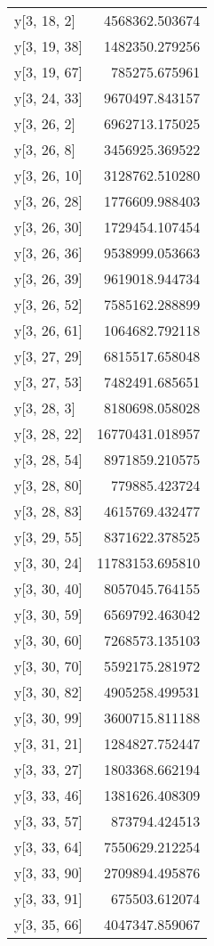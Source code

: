 \begin{longtable}{lr}
y[3, 18, 2] & 4568362.503674 \\
y[3, 19, 38] & 1482350.279256 \\
y[3, 19, 67] & 785275.675961 \\
y[3, 24, 33] & 9670497.843157 \\
y[3, 26, 2] & 6962713.175025 \\
y[3, 26, 8] & 3456925.369522 \\
y[3, 26, 10] & 3128762.510280 \\
y[3, 26, 28] & 1776609.988403 \\
y[3, 26, 30] & 1729454.107454 \\
y[3, 26, 36] & 9538999.053663 \\
y[3, 26, 39] & 9619018.944734 \\
y[3, 26, 52] & 7585162.288899 \\
y[3, 26, 61] & 1064682.792118 \\
y[3, 27, 29] & 6815517.658048 \\
y[3, 27, 53] & 7482491.685651 \\
y[3, 28, 3] & 8180698.058028 \\
y[3, 28, 22] & 16770431.018957 \\
y[3, 28, 54] & 8971859.210575 \\
y[3, 28, 80] & 779885.423724 \\
y[3, 28, 83] & 4615769.432477 \\
y[3, 29, 55] & 8371622.378525 \\
y[3, 30, 24] & 11783153.695810 \\
y[3, 30, 40] & 8057045.764155 \\
y[3, 30, 59] & 6569792.463042 \\
y[3, 30, 60] & 7268573.135103 \\
y[3, 30, 70] & 5592175.281972 \\
y[3, 30, 82] & 4905258.499531 \\
y[3, 30, 99] & 3600715.811188 \\
y[3, 31, 21] & 1284827.752447 \\
y[3, 33, 27] & 1803368.662194 \\
y[3, 33, 46] & 1381626.408309 \\
y[3, 33, 57] & 873794.424513 \\
y[3, 33, 64] & 7550629.212254 \\
y[3, 33, 90] & 2709894.495876 \\
y[3, 33, 91] & 675503.612074 \\
y[3, 35, 66] & 4047347.859067 \\

\end{longtable}
